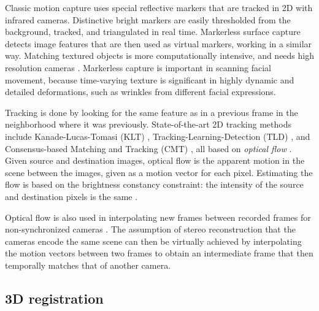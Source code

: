 
Classic motion capture uses special reflective markers that are tracked in 2D with infrared cameras.
Distinctive bright markers are easily thresholded from the background, tracked, and triangulated in real time.
Markerless surface capture detects image features that are then used as virtual markers, working in a similar way.
Matching textured objects is more computationally intensive, and needs high resolution cameras \cite{moeslund2001survey}.
Markerless capture is important in scanning facial movement, because time-varying texture is significant in highly dynamic and detailed deformations, such as wrinkles from different facial expressions.
\cite{bradley2008markerless,beeler2011high,bradley2010high}

Tracking is done by looking for the same feature as in a previous frame in the neighborhood where it was previously.
State-of-the-art 2D tracking methods include Kanade-Lucas-Tomasi (KLT) \cite{lucas1981iterative,tomasi1991detection}, Tracking-Learning-Detection (TLD) \cite{kalal2012tracking}, and Consensus-based Matching and Tracking (CMT) \cite{nebehay2014consensus}, all based on \emph{optical flow} \cite{horn1981determining,gibson1950perception,beauchemin1995computation}.
Given source and destination images, optical flow is the apparent motion in the scene between the images, given as a motion vector for each pixel.
Estimating the flow is based on the brightness constancy constraint: the intensity of the source and destination pixels is the same \cite{horn1974determining}.

Optical flow is also used in interpolating new frames between recorded frames for non-synchronized cameras \cite{bradley2009synchronization}.
The assumption of stereo reconstruction that the cameras encode the same scene can then be virtually achieved by interpolating the motion vectors between two frames to obtain an intermediate frame that then temporally matches that of another camera.


\subsection{3D registration} %

